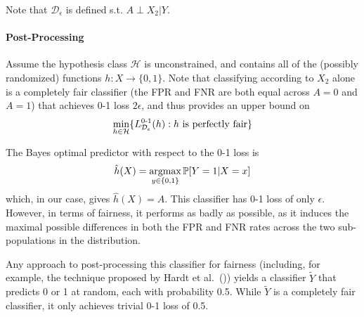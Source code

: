 Note that $\mathcal{D}_{\epsilon}$ is defined s.t. $A \perp X_2 | Y$.


\paragraph{Post-Processing}
Assume the hypothesis class $\mathcal{H}$ is unconstrained, and contains all of the (possibly randomized) functions $h:X \rightarrow \{0,1\}$. Note that classifying according to $X_2$ alone is a completely fair classifier (the FPR and FNR are both equal across $A = 0$ and $A=1$) that achieves 0-1 loss $2\epsilon$, and thus provides an upper bound on
\begin{equation*}
\min\limits_{h \in \mathcal{H}} \{L_{\mathcal{D}_{\epsilon}}^{0\textnormal{-}1}(h):h~\text{is perfectly fair}\}
\end{equation*}

The Bayes optimal predictor with respect to the 0-1 loss is
\begin{equation*}
\hat{h}(X) = \operatorname*{argmax}\limits_{y \in \{0,1\}} \operatorname*{\mathbb{P}}[Y=1|X=x]
\end{equation*}
which, in our case, gives $\hat{h}(X) = A$. This classifier has 0-1 loss of only $\epsilon$. However, in terms of fairness, it performs as badly as possible, as it induces the maximal possible differences in both the FPR and FNR rates across the two sub-populations in the distribution.  %

Any approach to post-processing this classifier for fairness (including, for example, the technique proposed by Hardt et al.~(\citeyear{hardt})) yields a classifier $\tilde{Y}$ that predicts 0 or 1 at random, each with probability 0.5. While $\tilde{Y}$ is a completely fair classifier, it only achieves trivial 0-1 loss of 0.5.

